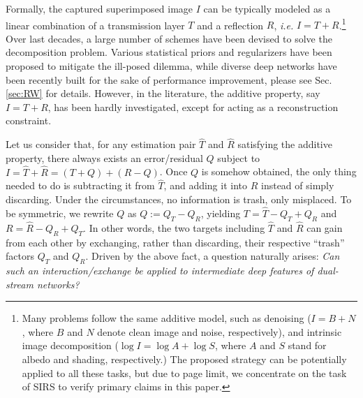 \documentclass{article}
\begin{document}
Formally, the captured superimposed image $I$ can be typically modeled as a linear combination of a transmission layer $T$ and a reflection $R$, \emph{i.e.} $I = T + R$.\footnote{Many problems follow the same additive model, such as denoising ($I=B+N$, where $B$ and $N$ denote clean image and noise, respectively), and intrinsic image decomposition ($\log{I}=\log{A}+\log{S}$, where $A$ and $S$ stand for albedo and shading, respectively.) The proposed strategy can be potentially applied to all these tasks, but due to page limit, we concentrate on the task of SIRS to verify primary claims in this paper.} Over last decades, a large number of schemes have been devised to solve the decomposition problem. Various statistical priors and regularizers have been proposed to mitigate the ill-posed dilemma, while diverse deep networks have been recently built for the sake of performance improvement, please see Sec. \ref{sec:RW} for details. However, in the literature, the additive property, say $I = T + R$, has been hardly investigated, except for acting as a reconstruction constraint.

Let us consider that, for any estimation pair $\hat{T}$ and $\hat{R}$ satisfying the additive property, there always exists an error/residual $Q$ subject to $I=\hat{T}+\hat{R}=(T+Q)+(R-Q)$. Once $Q$ is somehow obtained, the only thing needed to do is subtracting it from $\hat{T}$, and adding it into $\hat{R}$ instead of simply discarding. Under the circumstances, no information is trash, only misplaced. To be symmetric, we rewrite $Q$ as $Q:=Q_T-Q_R$, yielding $T=\hat{T}-Q_T+Q_R$ and $R=\hat{R}-Q_R+Q_T$. In other words, the two targets including $\hat{T}$ and $\hat{R}$ can gain from each other by exchanging, rather than discarding, their respective ``trash'' factors $Q_T$ and $Q_R$. Driven by the above fact, a question naturally arises: \emph{Can such an interaction/exchange be applied to intermediate deep features of dual-stream networks?}
\end{document}
